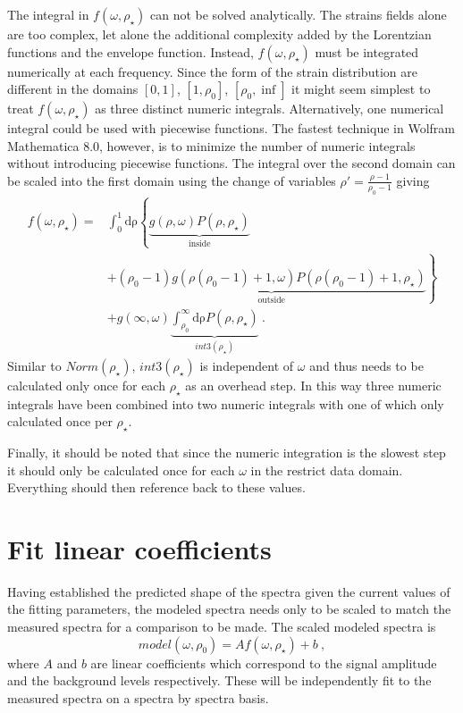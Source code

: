 The integral in $f(\omega,\rho_{\star})$ can not be solved analytically.
The strains fields alone are too complex, let alone the additional complexity added by the Lorentzian functions and the envelope function.
Instead, $f(\omega,\rho_{\star})$ must be integrated numerically at each frequency.
Since the form of the strain distribution are different in the domains $[0,1]$, $[1,\rho_0]$, $[\rho_0,\inf]$ it might seem simplest to treat $f(\omega,\rho_{\star})$ as three distinct numeric integrals.
Alternatively, one numerical integral could be used with piecewise functions.
The fastest technique in Wolfram Mathematica 8.0, however, is to minimize the number of numeric integrals without introducing piecewise functions.
The integral over the second domain can be scaled into the first domain using the change of variables $\rho'=\frac{\rho-1}{\rho_0-1}$ giving 
\begin{align*}
	f(\omega,\rho_{\star})=&\int_0^1 \mathrm{d\rho} \left \{ 
	\underbrace{g(\rho,\omega) P(\rho,\rho_{\star})}_{\textrm{inside}} \right. \\ 
	&\left. +\underbrace{(\rho_0-1) g(\rho(\rho_0-1)+1,\omega) P(\rho(\rho_0-1)+1,\rho_{\star})}_{\textrm{outside}}
	\right \} \\
	&+g(\infty,\omega) \underbrace{\int_{\rho_0}^{\infty} \mathrm{d\rho} P(\rho,\rho_{\star})}_{int3(\rho_{\star})} \ .
\end{align*}
Similar to $Norm(\rho_{\star})$, $int3(\rho_{\star})$ is independent of $\omega$ and thus needs to be calculated only once for each $\rho_{\star}$ as an overhead step.
In this way three numeric integrals have been combined into two numeric integrals with one of which only calculated once per $\rho_{\star}$.

Finally, it should be noted that since the numeric integration is the slowest step it should only be calculated once for each $\omega$ in the restrict data domain.
Everything should then reference back to these values.


\section*{Fit linear coefficients}
Having established the predicted shape of the spectra given the current values of the fitting parameters, the modeled spectra needs only to be scaled to match the measured spectra for a comparison to be made.
The scaled modeled spectra is
\begin{equation*}
	model(\omega,\rho_0)=A f(\omega,\rho_{\star}) + b \ ,
\end{equation*}
where $A$ and $b$ are linear coefficients which correspond to the signal amplitude and the background levels respectively.
These will be independently fit to the measured spectra on a spectra by spectra basis.

